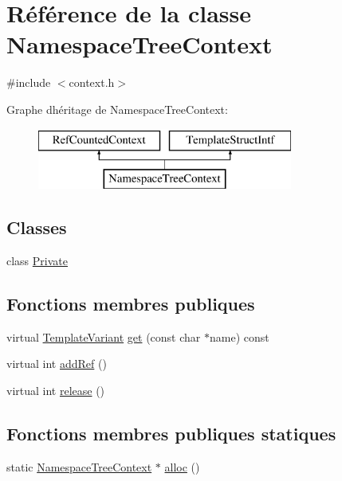 \hypertarget{class_namespace_tree_context}{}\section{Référence de la classe Namespace\+Tree\+Context}
\label{class_namespace_tree_context}


{\ttfamily \#include $<$context.\+h$>$}

Graphe d\textquotesingle{}héritage de Namespace\+Tree\+Context\+:\begin{figure}[H]
\begin{center}
\leavevmode
\includegraphics[height=2.000000cm]{class_namespace_tree_context}
\end{center}
\end{figure}
\subsection*{Classes}
\begin{DoxyCompactItemize}
\item 
class \hyperlink{class_namespace_tree_context_1_1_private}{Private}
\end{DoxyCompactItemize}
\subsection*{Fonctions membres publiques}
\begin{DoxyCompactItemize}
\item 
virtual \hyperlink{class_template_variant}{Template\+Variant} \hyperlink{class_namespace_tree_context_a02408db63be43a0b30d31e2a3da70c23}{get} (const char $\ast$name) const 
\item 
virtual int \hyperlink{class_namespace_tree_context_a2f77e1fafbf8e6e4245aade3fed316b8}{add\+Ref} ()
\item 
virtual int \hyperlink{class_namespace_tree_context_aa867e3f0d1ad5b49d6b0c72528f54c2e}{release} ()
\end{DoxyCompactItemize}
\subsection*{Fonctions membres publiques statiques}
\begin{DoxyCompactItemize}
\item 
static \hyperlink{class_namespace_tree_context}{Namespace\+Tree\+Context} $\ast$ \hyperlink{class_namespace_tree_context_ae910c89edd00342a3ce328f98d8a63ec}{alloc} ()
\end{DoxyCompactItemize}


